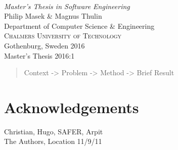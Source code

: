 \begin{titlepage}

\mbox{}
\vfill
\addtolength{\voffset}{2cm}
\begin{flushleft}
	{ \\[0.5cm]
	\emph{\Large Master's Thesis in Software Engineering} \\[.8cm]
	
	{\huge Philip Masek \& Magnus Thulin}\\[.8cm]
	
	{\Large Department of Computer Science \& Engineering \\
	\textsc{Chalmers University of Technology} \\
	Gothenburg, Sweden 2016 \\
	Master's Thesis 2016:1\\
	}
	}
\end{flushleft}

\end{titlepage}
\ClearShipoutPicture

\pagestyle{empty}
\newpage
\clearpage
\mbox{}
\newpage
\clearpage
\thispagestyle{empty}

\begin{abstract}
Context -> Problem -> Method -> Brief Result
\end{abstract}

\newpage
\clearpage
\mbox{}
\newpage
\clearpage
\thispagestyle{empty}
\section*{Acknowledgements}
Christian, Hugo, SAFER, Arpit \\[1cm]

\hfill The Authors, Location 11/9/11
\newpage
\clearpage
\mbox{}